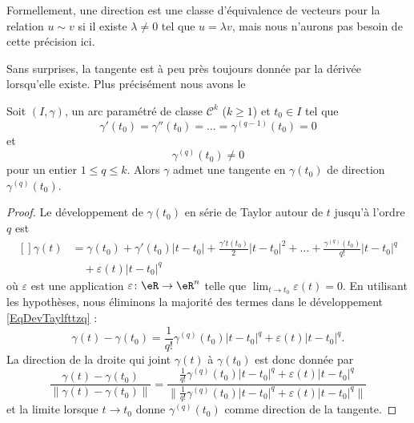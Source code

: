 Formellement, une direction est une classe d'équivalence de vecteurs pour la relation $u\sim v$ si il existe $\lambda\neq 0$ tel que $u=\lambda v$, mais nous n'aurons pas besoin de cette précision ici.

Sans surprises, la tangente est à peu près toujours donnée par la dérivée lorsqu'elle existe. Plus précisément nous avons le
\begin{theorem}
    Soit $(I,\gamma)$, un arc paramétré de classe $\mathcal{C}^k$ ($k\geq 1$) et $t_0\in I$ tel que
    \begin{equation}
        \gamma'(t_0)=\gamma''(t_0)=\ldots=\gamma^{(q-1)}(t_0)=0
    \end{equation}
    et
    \begin{equation}
        \gamma^{(q)}(t_0)\neq 0
    \end{equation}
    pour un entier $1\leq q\leq k$. Alors $\gamma$ admet une tangente en $\gamma(t_0)$ de direction $\gamma^{(q)}(t_0)$.
\end{theorem}

\begin{proof}
    
    Le développement de $\gamma(t_0)$ en série de Taylor autour de $t$ jusqu'à l'ordre $q$ est
    \begin{equation}        \label{EqDevTaylfttzq}
        \begin{aligned}[]
            \gamma(t)&=\gamma(t_0)+\gamma'(t_0)| t-t_0 |+\frac{ \gamma't(t_0) }{2}| t-t_0 |^2+\ldots +\frac{ \gamma^{(q)}(t_0) }{ q! }| t-t_0 |^q\\
                &\quad+\varepsilon(t)| t-t_0 |^q
        \end{aligned}
    \end{equation}
    où $\varepsilon$ est une application $\varepsilon\colon \eR\to \eR^n$ telle que $\lim_{t\to t_0} \varepsilon(t)=0$. En utilisant les hypothèses, nous éliminons la majorité des termes dans le développement \eqref{EqDevTaylfttzq} :
    \begin{equation}
        \gamma(t)-\gamma(t_0)=\frac{1}{ q! }\gamma^{(q)}(t_0)| t-t_0 |^q+\varepsilon(t)| t-t_0 |^q.
    \end{equation}
    La direction de la droite qui joint $\gamma(t)$ à $\gamma(t_0)$ est donc donnée par
    \begin{equation}
        \frac{ \gamma(t)-\gamma(t_0) }{ \| \gamma(t)-\gamma(t_0) \| }=\frac{ \frac{1}{ q! }\gamma^{(q)}(t_0)| t-t_0 |^q+\varepsilon(t)| t-t_0 |^q }{ \| \frac{1}{ q! }\gamma^{(q)}(t_0)| t-t_0 |^q+\varepsilon(t)| t-t_0 |^q\|  }
    \end{equation}
    et la limite lorsque $t\to t_0$ donne $\gamma^{(q)}(t_0)$ comme direction de la tangente.

\end{proof}

